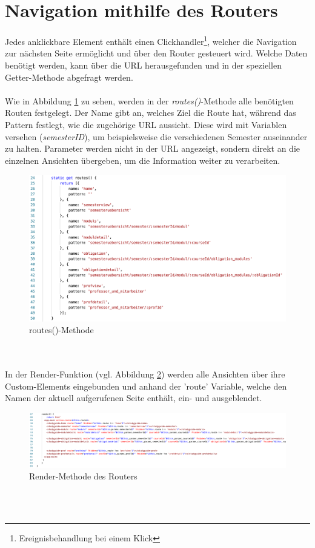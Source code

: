 \documentclass[12pt,					%
							 oneside,			%
							 a4paper,			%
							 halfparskip,		%
							 liststotoc,			%
							 bibtotoc,			%
							 fleqn,				%
							 pointlessnumbers]	%
							 {scrreprt}
\begin{document}
	\section{Navigation mithilfe des Routers}
	Jedes anklickbare Element enthält einen Clickhandler\footnote{\label{foot:1}Ereignisbehandlung bei einem Klick}, welcher die Navigation zur nächsten Seite ermöglicht und über den Router gesteuert wird. Welche Daten benötigt werden, kann über die URL herausgefunden und in der speziellen Getter-Methode abgefragt werden.	\\
\\	
	Wie in Abbildung \ref{routes} zu sehen, werden in der \textit{routes()}-Methode alle benötigten Routen festgelegt. Der Name gibt an, welches Ziel die Route hat, während das Pattern festlegt, wie die zugehörige URL aussieht. Diese wird mit Variablen versehen (\textit{semesterID}), um beispielsweise die verschiedenen Semester auseinander zu halten. Parameter werden nicht in der URL angezeigt, sondern direkt an die einzelnen Ansichten übergeben, um die Information weiter zu verarbeiten. 
\begin{figure}[h]
		\centering
		\includegraphics[width=1\textwidth]{pictures/routes-methode.png}
		\caption{routes()-Methode}						
		\label{routes}
	\end{figure} \\
	\\
	In der Render-Funktion  (vgl. Abbildung \ref{render-methode}) werden alle Ansichten über ihre Custom-Elements eingebunden und anhand der 'route' Variable, welche den Namen der aktuell aufgerufenen Seite enthält, ein- und ausgeblendet.\\	
	\begin{figure}[h]
		\centering
		\includegraphics[width=1\textwidth]{pictures/router-render.png}
		\caption{Render-Methode des Routers}						
		\label{render-methode}
	\end{figure}
\\
\\
\end{document}
